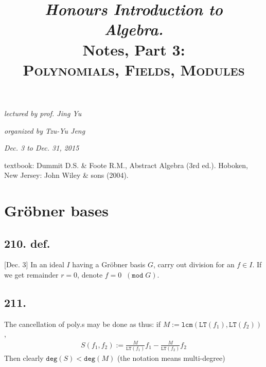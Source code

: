 \documentclass[12pt]{article}
\newcommand{\F}\frac%
\newcommand{\Tw}[1]{\texttt{#1}}%
\newcommand{\EqGo}[1]{ \begin{gather*}{#1}\end{gather*} } %
\begin{document}
\title{
 \textit{Honours Introduction to} \\
 \textit{\textbf{\Huge Algebra.}} \\
 Notes, Part 3: \\
 \huge\textsc{Polynomials, Fields, Modules}
}
\date{}
\author{}
\maketitle
\allowdisplaybreaks[4]%

\vspace{-3.4cm} %
\hfill{\itshape lectured by prof. Jing Yu} \par
\hfill{\itshape organized by Tzu-Yu Jeng} \par
\hfill{\itshape Dec. 3 to Dec. 31, 2015} \\
\vspace{-0.2cm} 

textbook: Dummit D.S. \& Foote R.M., Abstract Algebra (3rd ed.). Hoboken, New Jersey: John Wiley \& sons (2004). \par
[Herstein I.N., Topic in Algebra (2nd ed.). Hoboken, New Jersey: John Wiley \& sons (2004).] \par
[Fraleigh J.B., A First Course in Abstract Algebra (7th ed.). Boston, Massachusetts: Addison-Wesley (2003).]

\setcounter{section}{20}
\section{Gr\"obner bases}
\subsection*{210. def.} [Dec. 3] In an ideal \(I\) having a Gr\"obner basis \(G\), carry out division for an \(f \in I\). 
If we get remainder \(r=0\), denote \(f =0\;\; (\Tw{mod}\; G)\). 

\subsection*{211.} The cancellation of poly.s may be done as thus: if \(M := \Tw{lcm}(\Tw{LT}(f_1),\Tw{LT}(f_2))\), \EqGo{
 S(f_1,f_2) :=\F{M}{\Tw{LT}(f_1)}f_1 -\F{M}{\Tw{LT}(f_2)}f_2
} Then clearly \(\Tw{deg}(S) < \Tw{deg}(M)\) (the notation means multi-degree)
\end{document}
